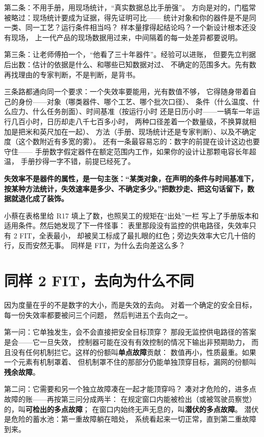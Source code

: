 第二条：不用手册，用现场统计，“真实数据总比手册强”。
方向是对的，门槛常被略过：现场统计要成为证据，得先证明可比——
统计对象和你的器件是不是同一类、同一工艺？运行条件相当吗？
样本量撑得起结论吗？一个新设计根本还没有现场，
上一代产品的现场数据用过来，中间隔着的每一处差异都要说明。

第三条：让老师傅拍一个，“他看了三十年器件”。经验可以进账，
但要先立判据后出数：估计的依据是什么、和哪些已知数据对过、
不确定的范围多大。先有数再找理由的专家判断，不是判断，是背书。

三条路都通向同一个要求：一个失效率要能用，光有数值不够，
它得随身带着自己的身份——对象（哪类器件、哪个工艺、哪个批次口径）、
条件（什么温度、什么应力、什么任务剖面）、时间基准（按运行小时
还是日历小时——一辆车一年运行几百小时，日历却走八千七百多小时，
两种口径差着一个数量级，不换算就相加是把米和英尺加在一起）、
方法（手册、现场统计还是专家判断）、以及不确定度（这个数附近有多宽的雾）。
还有一条最容易忘的：数字的前提在设计这边也要守住——
手册数字假定器件在额定范围内工作，如果你的设计让那颗电容长年超温，
手册抄得一字不错，前提已经死了。

\textbf{失效率不是器件的属性，是一句主张：“某类对象，在声明的条件与时间基准下，按某种方法统计，失效速率是多少、不确定多少。”把数抄走、把这句话留下，数据就退化成了装饰。}

小蔡在表格里给 R17 填上了数，也照吴工的规矩在“出处”一栏
写上了手册版本和适用条件。然后她发现了下一件怪事：
表里那段没有监控的供电路径，失效率只有 2 FIT，全表最小，
却被吴工标成了最扎眼的红色；旁边失效率大它几十倍的行，反而安然无事。
同样是 FIT，为什么去向差这么多？

\section{同样 2 FIT，去向为什么不同}

因为度量在乎的不是数字的大小，而是失效的去向。
对着一个确定的安全目标，每一份失效率都要被问三个问题，
然后判进五个去向之一。

第一问：它单独发生，会不会直接把安全目标顶穿？
那段无监控供电路径的答案是会——它一旦失效，
控制器可能在没有有效控制的情况下输出非预期助力，
而且没有任何机制拦它。这样的份额叫\textbf{单点故障}贡献：
数值再小，性质最重。如果一个元素有机制罩着、
但机制罩不住的那部分仍能单独顶穿目标，漏网的份额叫\textbf{残余故障}。

第二问：它需要和另一个独立故障凑在一起才能顶穿吗？
凑对才危险的，进多点故障的账——再按第三问分成两半：
在规定窗口内能被检出（或被驾驶员察觉）的，叫\textbf{可检出的多点故障}；
在窗口内始终无声无息的，叫\textbf{潜伏的多点故障}。
潜伏是危险的蓄水池：第一重故障躺在暗处，
系统看起来一切正常，直到第二重故障到来。

